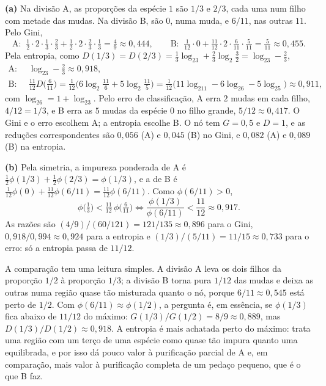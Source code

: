 \begin{solucao}
\textbf{(a)} Na divisão A, as proporções da espécie $1$ são $1/3$ e $2/3$, cada uma num filho
com metade das mudas. Na divisão B, são $0$, numa muda, e $6/11$, nas outras $11$. Pelo Gini,
\[
  \text{A: }\ \tfrac12\cdot2\cdot\tfrac13\cdot\tfrac23+\tfrac12\cdot2\cdot\tfrac23\cdot\tfrac13=\tfrac49\approx0{,}444,
  \qquad
  \text{B: }\ \tfrac1{12}\cdot0+\tfrac{11}{12}\cdot2\cdot\tfrac6{11}\cdot\tfrac5{11}=\tfrac5{11}\approx0{,}455 .
\]
Pela entropia, como $D(1/3)=D(2/3)=\tfrac13\log_23+\tfrac23\log_2\tfrac32=\log_23-\tfrac23$,
\begin{align*}
  \text{A: }\ &\log_23-\tfrac23\approx0{,}918,\\
  \text{B: }\ &\tfrac{11}{12}D\big(\tfrac6{11}\big)
  =\tfrac1{12}\Big(6\log_2\tfrac{11}6+5\log_2\tfrac{11}5\Big)
  =\tfrac1{12}\big(11\log_211-6\log_26-5\log_25\big)\approx0{,}911 ,
\end{align*}
com $\log_26=1+\log_23$. Pelo erro de classificação, A erra $2$ mudas em cada filho, $4/12=1/3$,
e B erra as $5$ mudas da espécie $0$ no filho grande, $5/12\approx0{,}417$. O Gini e o erro
escolhem A; a entropia escolhe B. O nó tem $G=0{,}5$ e $D=1$, e as reduções correspondentes são
$0{,}056$ (A) e $0{,}045$ (B) no Gini, e $0{,}082$ (A) e $0{,}089$ (B) na entropia.

\smallskip
\textbf{(b)} Pela simetria, a impureza ponderada de A é
$\tfrac12\phi(1/3)+\tfrac12\phi(2/3)=\phi(1/3)$, e a de B é
$\tfrac1{12}\phi(0)+\tfrac{11}{12}\phi(6/11)=\tfrac{11}{12}\phi(6/11)$. Como $\phi(6/11)>0$,
\[
  \phi\big(\tfrac13\big)<\tfrac{11}{12}\,\phi\big(\tfrac6{11}\big)
  \iff \frac{\phi(1/3)}{\phi(6/11)}<\frac{11}{12}\approx0{,}917 .
\]
As razões são $(4/9)/(60/121)=121/135\approx0{,}896$ para o Gini,
$0{,}918/0{,}994\approx0{,}924$ para a entropia e $(1/3)/(5/11)=11/15\approx0{,}733$ para o erro: só
a entropia passa de $11/12$.

A comparação tem uma leitura simples. A divisão A leva os dois filhos da proporção $1/2$ à
proporção $1/3$; a divisão B torna pura $1/12$ das mudas e deixa as outras numa região quase tão
misturada quanto o nó, porque $6/11\approx0{,}545$ está perto de $1/2$. Com
$\phi(6/11)\approx\phi(1/2)$, a pergunta é, em essência, se $\phi(1/3)$ fica abaixo de $11/12$ do
máximo: $G(1/3)/G(1/2)=8/9\approx0{,}889$, mas $D(1/3)/D(1/2)\approx0{,}918$. A entropia é mais
achatada perto do máximo: trata uma região com um terço de uma espécie como quase tão impura
quanto uma equilibrada, e por isso dá pouco valor à purificação parcial de A e, em comparação,
mais valor à purificação completa de um pedaço pequeno, que é o que B faz.


\end{solucao}
